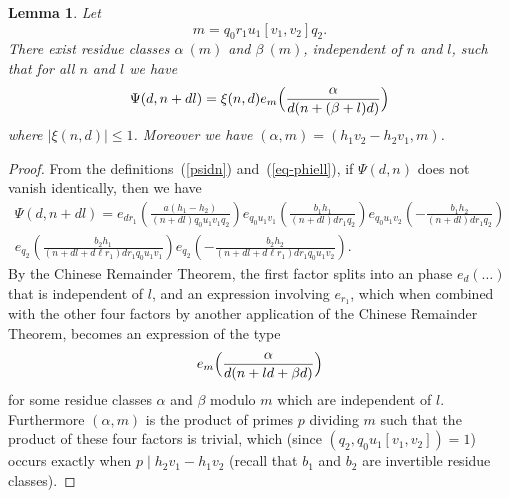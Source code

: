 \documentclass[12pt,a4paper,reqno]{amsart}
\numberwithin{equation}{section}
\theoremstyle{plain}
\newtheorem{lemma}[theorem]{Lemma}
\theoremstyle{definition}
\newcommand\Z{\mathbb{Z}}
\begin{document}
\begin{lemma}\label{lm-clean-up}
Let 
$$
m=q_0r_1u_1[v_1,v_2]q_2.
$$
There exist residue classes $\alpha\ (m)$ and $\beta\
(m)$, independent of $n$ and $l$, such that for all $n$ and $l$ we
have
$$
\Psi(d,n+dl)=\xi(n,d)e_m\Bigl(\frac{\alpha}{d(n+(\beta+l)d)}\Bigr)
$$
where $|\xi(n,d)|\leq 1$. Moreover we have
$(\alpha,m)=(h_1v_2-h_2v_1,m)$.
\end{lemma}

\begin{proof}
  From the definitions~(\ref{psidn}) and~(\ref{eq-phiell}), if
  $\Psi(d,n)$ does not vanish identically, then we have
\begin{multline*}
  \Psi(d,n+dl)=e_{dr_1}\left( \frac{a(h_1-h_2)}{(n+dl)q_0 u_1v_1q_2}
  \right) e_{q_0 u_1v_1}\left( \frac{b_1h_1}{(n+dl) dr_1 q_2} \right)
  e_{q_0 u_1v_2}\left( -\frac{b_1h_2}{(n+dl) dr_1 q_2} \right)\\
  e_{q_2}\left( \frac{b_2 h_1}{(n+dl+d \ell r_1) dr_1 q_0 u_1v_1} \right)
  e_{q_2}\left(- \frac{b_2 h_2}{(n+dl+d\ell r_1) dr_1 q_0 u_1v_2} \right).
\end{multline*}
By the Chinese Remainder Theorem, the first factor splits into an phase $e_d(\dots)$ that is independent of $l$, and an expression involving $e_{r_1}$, which when combined with the other four factors by another application of the Chinese Remainder Theorem, becomes an expression of
the type
$$
e_m\Bigl(\frac{\alpha }{d(n+ld+\beta d)}\Bigr)
$$
for some residue classes $\alpha$ and $\beta$ modulo $m$ which are
independent of $l$. Furthermore $(\alpha,m)$ is the product of primes
$p$ dividing $m$ such that the product of these four factors is
trivial, which (since $(q_2,q_0u_1[v_1,v_2])=1$) occurs exactly when
$p\mid h_2v_1-h_1v_2$ (recall that $b_1$ and $b_2$ are invertible
residue classes).

\end{proof}
\end{document}
